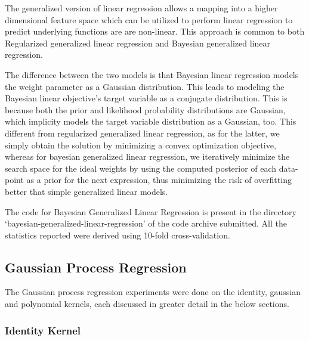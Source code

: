 \documentclass[parskip=full]{scrartcl}
\begin{document}
            The generalized version of linear regression allows a mapping into a higher dimensional feature space which can be utilized to perform linear regression to predict underlying functions are are non-linear. This approach is common to both Regularized generalized linear regression and Bayesian generalized linear regression.

            The difference between the two models is that Bayesian linear regression models the weight parameter as a Gaussian distribution. This leads to modeling the Bayesian linear objective's target variable as a conjugate distribution. This is because both the prior and likelihood probability distributions are Gaussian, which implicity models the target variable distribution as a Gaussian, too. This different from regularized generalized linear regression, as for the latter, we simply obtain the solution by minimizing a convex optimization objective, whereas for bayesian generalized linear regression, we iteratively minimize the search space for the ideal weights by using the computed posterior of each data-point as a prior for the next expression, thus minimizing the risk of overfitting better that simple generalized linear models.
        

        The code for Bayesian Generalized Linear Regression is present in the directory `bayesian-generalized-linear-regression' of the code archive submitted. All the statistics reported were derived using 10-fold cross-validation.
    

    \subsection{Gaussian Process Regression} %
    \label{sub:gaussian_process_regression}

        The Gaussian process regression experiments were done on the identity, gaussian and polynomial kernels, each discussed in greater detail in the below sections.

        \subsubsection*{Identity Kernel} %
        \label{ssub:identity_kernel}
\end{document}
